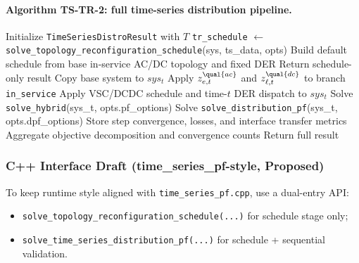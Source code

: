\paragraph{Algorithm TS-TR-2: full time-series distribution pipeline.}
\begin{algorithmic}[1]
  \State Initialize \texttt{TimeSeriesDistroResult} with \(T\)
    \State \texttt{tr\_schedule} \(\gets\) \texttt{solve\_topology\_reconfiguration\_schedule}(sys, ts\_data, opts)
  \Else
    \State Build default schedule from base in-service AC/DC topology and fixed DER
  \EndIf
    \State Return schedule-only result
  \EndIf
    \State Copy base system to \(sys_t\)
    \State Apply \(z^{\qual{ac}}_{e,t}\) and \(z^{\qual{dc}}_{\ell,t}\) to branch \texttt{in\_service}
    \State Apply VSC/DCDC schedule and time-\(t\) DER dispatch to \(sys_t\)
      \State Solve \texttt{solve\_hybrid}(sys\_t, opts.pf\_options)
    \EndIf
      \State Solve \texttt{solve\_distribution\_pf}(sys\_t, opts.dpf\_options)
    \EndIf
    \State Store step convergence, losses, and interface transfer metrics
  \EndFor
  \State Aggregate objective decomposition and convergence counts
  \State Return full result
\EndProcedure
\end{algorithmic}

\subsubsection{C++ Interface Draft (time\_series\_pf-style, Proposed)}
\label{sec:tstr-cpp-draft}

To keep runtime style aligned with \texttt{time\_series\_pf.cpp}, use a dual-entry API:
\begin{itemize}
\item \texttt{solve\_topology\_reconfiguration\_schedule(...)} for schedule stage only;
\item \texttt{solve\_time\_series\_distribution\_pf(...)} for schedule + sequential validation.
\end{itemize}

